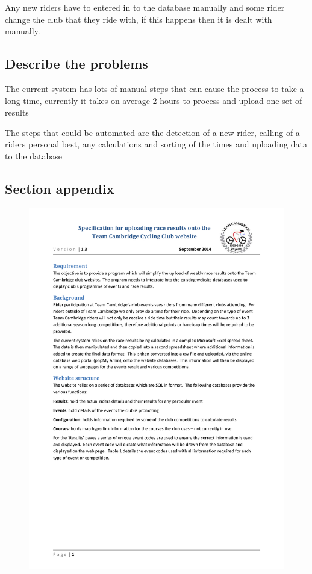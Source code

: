 Any new riders have to entered in to the database manually and some rider change the club that they ride with, if this happens then it is dealt with manually.
\subsection{Describe the problems}
The current system has lots of manual steps that can cause the process to take a long time, currently it takes on average 2 hours to process and upload one set of results

The steps that could be automated are the detection of a new rider, calling of a riders personal best, any calculations and sorting of the times and uploading data to the database
\subsection{Section appendix}

\begin{figure}[H]
    \includegraphics[width=\textwidth]{./TeamCambridgeSpec/page1.pdf}
\end{figure}

